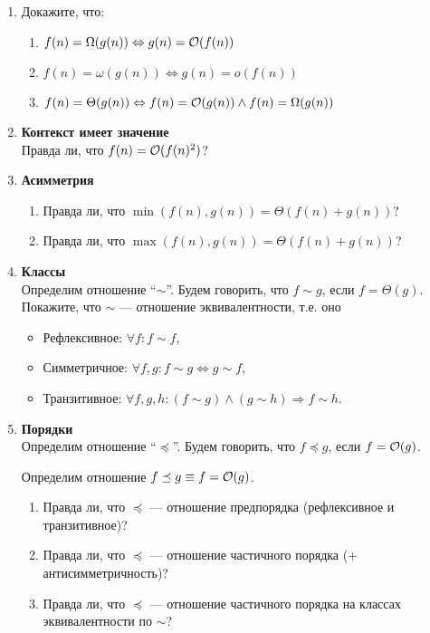 \begin{enumerate}
  \item
    Докажите, что:
    \begin{enumerate}
      \item $f(n) = \Omega(g(n)) \Leftrightarrow g(n) = \mathcal{O}(f(n))$
      \item $f(n) = \omega(g(n)) \Leftrightarrow g(n) = o(f(n))$
      \item $f(n) = \Theta(g(n)) \Leftrightarrow f(n) = \mathcal{O}(g(n)) \wedge f(n) = \Omega(g(n))$
    \end{enumerate}

  \item
    {\bf Контекст имеет значение} \\
    Правда ли, что $f(n) = \mathcal{O}(f(n)^2)$?

  \item
    {\bf Асимметрия}
    \begin{enumerate}
      \item Правда ли, что $\min(f(n), g(n)) = \Theta(f(n) + g(n))$?
      \item Правда ли, что $\max(f(n), g(n)) = \Theta(f(n) + g(n))$?
    \end{enumerate}

  \item
    {\bf Классы} \\
    Определим отношение ``$\sim$''. Будем говорить, что $f \sim g$, если $f = \Theta(g)$. Покажите, что
    $\sim$ --- отношение эквивалентности, т.е. оно
    \begin{itemize}
    \item Рефлексивное: $\forall f : f \sim f$,
    \item Симметричное: $\forall f, g: f \sim g \Leftrightarrow g \sim
      f$,
    \item Транзитивное: $\forall f, g, h: (f \sim g) \wedge (g \sim h)
      \Rightarrow f \sim h$.
    \end{itemize}

  \item
    {\bf Порядки} \\
    Определим отношение ``$\preceq$''. Будем говорить, что $f \preceq g$, если $f = \mathcal{O}(g)$.
    
    Определим отношение $f \preceq g \equiv f = \mathcal{O}(g)$.
    \begin{enumerate}
      \item Правда ли, что $\preceq$ --- отношение предпорядка (рефлексивное и транзитивное)?
      \item Правда ли, что $\preceq$ --- отношение частичного порядка
        (+ антисимметричность)?
      \item Правда ли, что $\preceq$ --- отношение частичного порядка
        на классах эквивалентности по $\sim$?
    \end{enumerate}


\end{enumerate}
